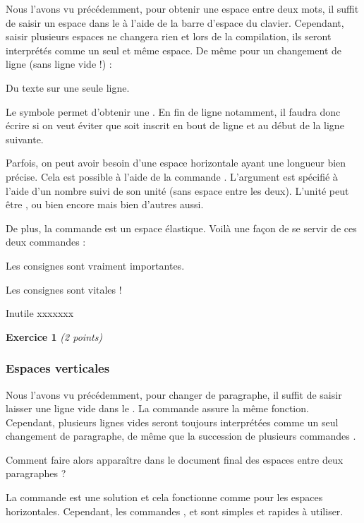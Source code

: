 \documentclass[10pt,french]{book}
\begin{document}
Nous l'avons vu précédemment, pour obtenir une espace entre deux mots, il suffit de saisir un espace dans le  à l'aide de la barre d'espace du clavier. Cependant, saisir plusieurs espaces ne changera rien et lors de la compilation, ils seront interprétés comme un seul et même espace. De même pour un changement de ligne (sans ligne vide !) :\medskip

{\NewFont
\begin{SideBySideExample}[showspaces=true]
    Du texte
        sur une
    seule          ligne.
\end{SideBySideExample}
}

\begin{info}
    Le symbole \ordi{\~{}} permet d'obtenir une . En fin de ligne notamment, il faudra donc écrire  si on veut éviter que  soit inscrit en bout de ligne et  au début de la ligne suivante.
\end{info}

Parfois, on peut avoir besoin d'une espace horizontale ayant une longueur bien précise. Cela est possible à l'aide de la commande . L'argument  est spécifié à l'aide d'un nombre suivi de son unité (sans espace entre les deux). L'unité peut être ,  ou bien encore  mais bien d'autres aussi.\par
De plus, la commande  est un espace élastique. Voilà une façon de se servir de ces deux commandes :\bigskip

{\NewFont
\begin{SideBySideExample}
    Les consignes sont vraiment importantes.\par
    Les consignes sont \hspace{1.4cm} vitales !\par
    Inutile \hspace{-1.3cm} xxxxxxx\par
    \textbf{Exercice 1} \hfill \textit{(2 points)}
\end{SideBySideExample}
\bigskip
}

\subsubsection{Espaces verticales}

Nous l'avons vu précédemment, pour changer de paragraphe, il suffit de saisir laisser une ligne vide dans le . La commande  assure la même fonction. Cependant, plusieurs lignes vides seront toujours interprétées comme un seul changement de paragraphe, de même que la succession de plusieurs commandes .\par
Comment faire alors apparaître dans le document final des espaces entre deux paragraphes ?\par
La commande  est une solution et cela fonctionne comme pour les espaces horizontales. Cependant, les commandes ,  et  sont simples et rapides à utiliser.\bigskip
\end{document}
